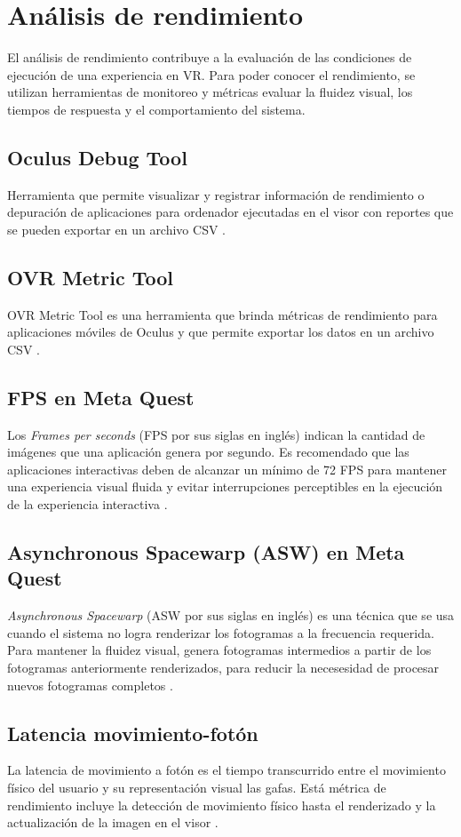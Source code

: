 %
\section{Análisis de rendimiento}
El análisis de rendimiento contribuye a la evaluación de las condiciones de ejecución de una experiencia en VR. 
Para poder conocer el rendimiento, se utilizan herramientas de monitoreo y métricas evaluar la fluidez visual, los tiempos de respuesta y el comportamiento del sistema.
\subsection{Oculus Debug Tool}
Herramienta que permite visualizar y registrar información de rendimiento o depuración de aplicaciones para ordenador ejecutadas en el visor con reportes que se pueden exportar en un archivo CSV \cite{OculusDebugTool}.
\subsection{OVR Metric Tool}
OVR Metric Tool es una herramienta que brinda métricas de rendimiento para aplicaciones móviles de Oculus y que permite exportar los datos en un archivo CSV \cite{OVRMetricTool}.
\subsection{FPS en Meta Quest}
Los \emph{Frames per seconds} (FPS por sus siglas en inglés) indican la cantidad de imágenes que una aplicación genera por segundo. 
Es recomendado que las aplicaciones interactivas deben de alcanzar un mínimo de 72 FPS para mantener una experiencia visual fluida y evitar interrupciones perceptibles en la ejecución de la experiencia interactiva \cite{MetaUnityPerf}. 
\subsection{Asynchronous Spacewarp (ASW) en Meta Quest}
\emph{Asynchronous Spacewarp }(ASW por sus siglas en inglés) es una técnica que se usa cuando el sistema no logra
renderizar los fotogramas a la frecuencia requerida. Para mantener la fluidez visual, genera fotogramas intermedios 
a partir de los fotogramas anteriormente renderizados, para reducir la necesesidad de procesar nuevos fotogramas completos \cite{ASWMetaQuest}.
\subsection{Latencia movimiento-fotón}
La latencia de movimiento a fotón es el tiempo transcurrido entre el movimiento físico del usuario y su representación visual las gafas. 
Está métrica de rendimiento incluye la detección de movimiento físico hasta el renderizado y la actualización de la imagen en el visor \cite{motionToPhotonLatency}. 

